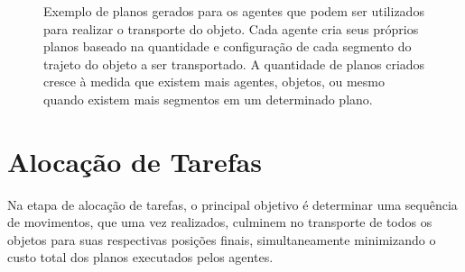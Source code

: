 \begin{figure}[hbtp]
    \centering
    \setlength{\fboxsep}{0pt}
    \caption[Planos de movimentação dos agentes]{Exemplo de planos gerados para os agentes que podem ser utilizados para realizar o transporte do objeto. Cada agente cria seus próprios planos baseado na quantidade e configuração de cada segmento do trajeto do objeto a ser transportado. A quantidade de planos criados cresce à medida que existem mais agentes, objetos, ou mesmo quando existem mais segmentos em um determinado plano.}
    \label{fig:robot_plan}
\end{figure}


\section{Alocação de Tarefas} %
\label{sec:aloca_o_de_tarefas}

Na etapa de alocação de tarefas, o principal objetivo é determinar uma sequência de movimentos, que uma vez realizados, culminem no transporte de todos os objetos para suas respectivas posições finais, simultaneamente minimizando o custo total dos planos executados pelos agentes.

